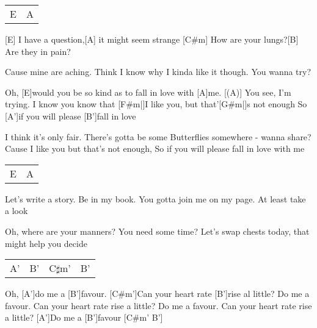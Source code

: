 


\begin{guitar}
	 {\footnotesize\begin{tabular}{|l|l|}
		E & A
	\end{tabular} }
	
	[E] I have a question,[A] it might seem strange
	[C#m] How are your lungs?[B] Are they in pain?
	
	Cause mine are aching. Think I know why
	I kinda like it though. You wanna try?
	
	\begin{highlightbar}
		Oh, [E]would you be so kind as to fall in love with [A]me.
		[(A)] You see, I'm trying. I know you know that 
		[F#m|]{I }like you, but that'[G#m|]{s }not enough
		So [A']if you will please [B']fall in love
		
		I think it's only fair. There's gotta be some 
		Butterflies somewhere - wanna share?
		Cause I like you but that's not enough,
		So if you will please fall in love with me
	\end{highlightbar}
	
	 {\footnotesize\begin{tabular}{|l|l|}
			E & A
		\end{tabular} }
	
	Let's write a story. Be in my book.
	You gotta join me on my page. At least take a look
	
	Oh, where are your manners? You need some time?
	Let's swap chests today, that might help you decide
	
	 
	
	 {\footnotesize\begin{tabular}{|l|l|l|l|}
			A' & B' & C$\sharp$m' & B'
	\end{tabular} }
	\pagebreak
	Oh, [A']do me a [B']favour. [C#m']Can your heart rate [B']rise al little?
	Do me a favour. Can your heart rate rise a little?
	Do me a favour. Can your heart rate rise a little?
	[A']Do me a [B']favour [C#m' B']{}
	

\end{guitar}
